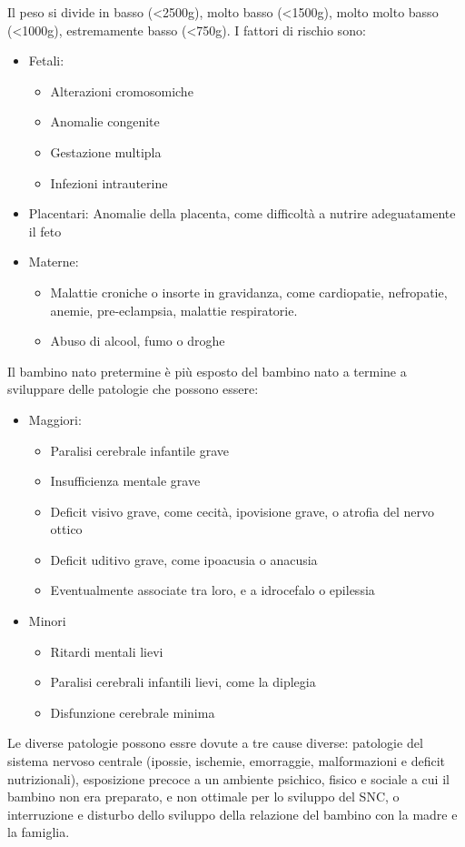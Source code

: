 Il peso si divide in basso (<2500g), molto basso (<1500g), molto molto basso (<1000g), estremamente basso (<750g).
I fattori di rischio sono:
\begin{itemize}
\item Fetali:
\begin{itemize}
\item Alterazioni cromosomiche
\item Anomalie congenite
\item Gestazione multipla
\item Infezioni intrauterine
\end{itemize}
\item Placentari: Anomalie della placenta, come difficoltà a nutrire adeguatamente il feto
\item Materne:
\begin{itemize}
\item Malattie croniche o insorte in gravidanza, come cardiopatie, nefropatie, anemie, pre-eclampsia, malattie respiratorie.
\item Abuso di alcool, fumo o droghe
\end{itemize}
\end{itemize}

Il bambino nato pretermine è più esposto del bambino nato a termine a sviluppare delle patologie che possono essere:
\begin{itemize}
\item Maggiori:
\begin{itemize}
\item Paralisi cerebrale infantile grave
\item Insufficienza mentale grave
\item Deficit visivo grave, come cecità, ipovisione grave, o atrofia del nervo ottico
\item Deficit uditivo grave, come ipoacusia o anacusia
\item Eventualmente associate tra loro, e a idrocefalo o epilessia
\end{itemize}
\item Minori
\begin{itemize}
\item Ritardi mentali lievi
\item Paralisi cerebrali infantili lievi, come la diplegia
\item Disfunzione cerebrale minima
\end{itemize}
\end{itemize}

Le diverse patologie possono essre dovute a tre cause diverse: patologie del sistema nervoso centrale (ipossie,
ischemie, emorraggie, malformazioni e deficit nutrizionali), esposizione precoce a un ambiente psichico, fisico
e sociale a cui il bambino non era preparato, e non ottimale per lo sviluppo del SNC, o interruzione e disturbo
dello sviluppo della relazione del bambino con la madre e la famiglia.

